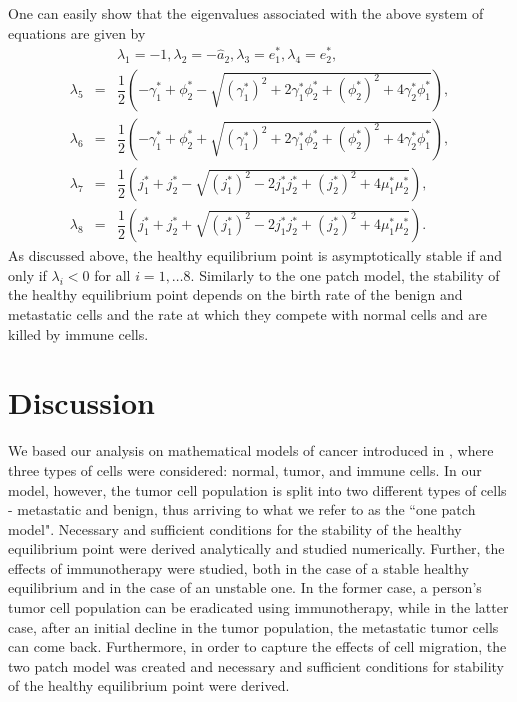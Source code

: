 \documentclass[letter,10pt]{article}
\begin{document}
One can easily show that the eigenvalues associated with the above system of equations are given by
\begin{eqnarray}
&&\lambda_1 =-1, \lambda_2 = -\hat{a}_2, \lambda_3 = e_1^*, \lambda_4 = e_2^*, \nonumber\\
\lambda_5 &=& \dfrac{1}{2}(-\gamma_1^* + \phi_2^* - \sqrt{(\gamma_1^*)^2 + 2\gamma_1^*\phi_2^* + (\phi_2^*)^2 + 4\gamma_2^*\phi_1^*}), \nonumber\\
\lambda_6 &=& \dfrac{1}{2}(-\gamma_1^* + \phi_2^* + \sqrt{(\gamma_1^*)^2 + 2\gamma_1^*\phi_2^* + (\phi_2^*)^2 + 4\gamma_2^*\phi_1^*}), \nonumber\\
\lambda_7 &=& \dfrac{1}{2}(j_1^* + j_2^* - \sqrt{(j_1^*)^2 - 2j_1^*j_2^* + (j_2^*)^2 + 4\mu_1^*\mu_2^*}), \nonumber\\
\lambda_8 &=& \dfrac{1}{2}(j_1^* + j_2^* + \sqrt{(j_1^*)^2 - 2j_1^*j_2^* + (j_2^*)^2 + 4\mu_1^*\mu_2^*}).\nonumber
\end{eqnarray}
 As discussed above, the healthy equilibrium point is asymptotically stable if and only if $\lambda_i<0$ for all $i=1,\dots 8$. Similarly to the one patch model, the stability of the healthy equilibrium point depends on the birth rate of the benign and metastatic cells and the rate at which they compete with normal cells and are killed by immune cells.




\section{Discussion}

We  based our analysis on mathematical models of cancer introduced in  \cite{DEPILLIS}, where three types of cells were considered: normal, tumor, and immune cells. In our model, however, the tumor cell population is split into two different types of cells - metastatic and benign, thus arriving to what we refer to as the ``one patch model". Necessary and sufficient conditions for the stability of the healthy equilibrium point were derived analytically and studied numerically. Further, the effects of immunotherapy were studied, both in the case of a stable healthy equilibrium and in the case of an unstable one. In the former case, a person's tumor cell population can be eradicated using immunotherapy, while in the latter case, after an initial decline in the tumor population, the metastatic tumor cells can come back. Furthermore, in order to capture the effects of cell migration, the two patch model was created and necessary and sufficient conditions for stability of the healthy equilibrium point were derived. 
\end{document}
